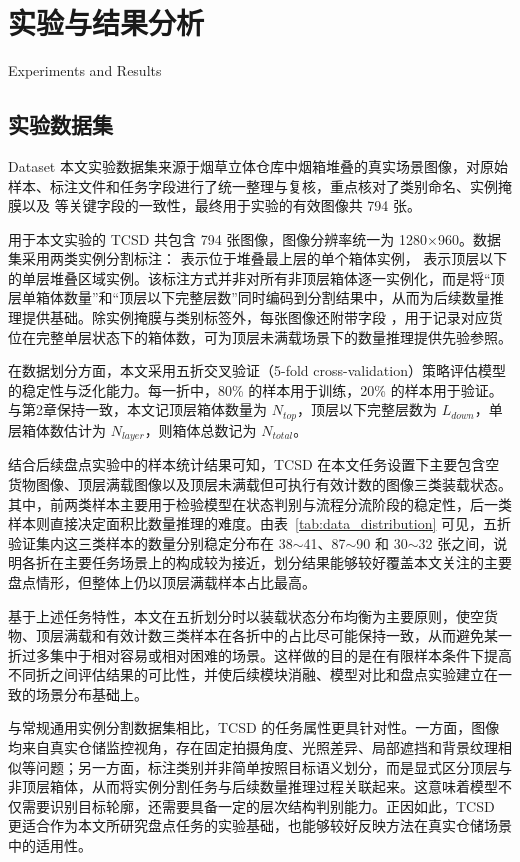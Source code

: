 \chapter{实验与结果分析}{Experiments and Results}

\section{实验数据集}{Dataset}
本文实验数据集来源于烟草立体仓库中烟箱堆叠的真实场景图像，对原始样本、标注文件和任务字段进行了统一整理与复核，重点核对了类别命名、实例掩膜以及  等关键字段的一致性，最终用于实验的有效图像共 794 张。

用于本文实验的 TCSD 共包含 794 张图像，图像分辨率统一为 1280×960。数据集采用两类实例分割标注： 表示位于堆叠最上层的单个箱体实例， 表示顶层以下的单层堆叠区域实例。该标注方式并非对所有非顶层箱体逐一实例化，而是将“顶层单箱体数量”和“顶层以下完整层数”同时编码到分割结果中，从而为后续数量推理提供基础。除实例掩膜与类别标签外，每张图像还附带字段 ，用于记录对应货位在完整单层状态下的箱体数，可为顶层未满载场景下的数量推理提供先验参照。

在数据划分方面，本文采用五折交叉验证（5-fold cross-validation）策略评估模型的稳定性与泛化能力。每一折中，80\% 的样本用于训练，20\% 的样本用于验证。与第2章保持一致，本文记顶层箱体数量为 $N_{\mathit{top}}$，顶层以下完整层数为 $L_{\mathit{down}}$，单层箱体数估计为 $N_{\mathit{layer}}$，则箱体总数记为 $N_{\mathit{total}}$。

结合后续盘点实验中的样本统计结果可知，TCSD 在本文任务设置下主要包含空货物图像、顶层满载图像以及顶层未满载但可执行有效计数的图像三类装载状态。其中，前两类样本主要用于检验模型在状态判别与流程分流阶段的稳定性，后一类样本则直接决定面积比数量推理的难度。由表~\ref{tab:data_distribution} 可见，五折验证集内这三类样本的数量分别稳定分布在 38$\sim$41、87$\sim$90 和 30$\sim$32 张之间，说明各折在主要任务场景上的构成较为接近，划分结果能够较好覆盖本文关注的主要盘点情形，但整体上仍以顶层满载样本占比最高。

基于上述任务特性，本文在五折划分时以装载状态分布均衡为主要原则，使空货物、顶层满载和有效计数三类样本在各折中的占比尽可能保持一致，从而避免某一折过多集中于相对容易或相对困难的场景。这样做的目的是在有限样本条件下提高不同折之间评估结果的可比性，并使后续模块消融、模型对比和盘点实验建立在一致的场景分布基础上。

与常规通用实例分割数据集相比，TCSD 的任务属性更具针对性。一方面，图像均来自真实仓储监控视角，存在固定拍摄角度、光照差异、局部遮挡和背景纹理相似等问题；另一方面，标注类别并非简单按照目标语义划分，而是显式区分顶层与非顶层箱体，从而将实例分割任务与后续数量推理过程关联起来。这意味着模型不仅需要识别目标轮廓，还需要具备一定的层次结构判别能力。正因如此，TCSD 更适合作为本文所研究盘点任务的实验基础，也能够较好反映方法在真实仓储场景中的适用性。

